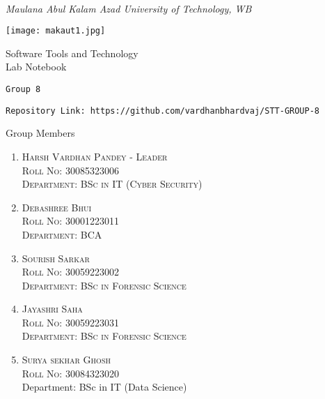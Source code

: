 \documentclass[a4paper,12pt]{article}
\begin{document}
\begin{titlepage}
    \centering
    \vspace*{0 cm}
    \Large\\
    \textit{Maulana Abul Kalam Azad University of Technology, WB}
    \vspace{0.5cm}
    
    \texttt{[image: makaut1.jpg]} %
    \vspace{0.5cm}
    
    \LARGE
    \textit{}{{Software Tools and Technology\\
        Lab Notebook }}
    \vspace{0.5cm}
    
    \large
    \texttt{Group 8}
    \vspace{1 cm}
    
    \texttt{Repository Link: https://github.com/vardhanbhardvaj/STT-GROUP-8}
    \vspace{1cm}
    
    \textit{}{Group Members}
    \vspace{0.5cm}

    \normalsize
    \begin{enumerate}
        \item \textsc{Harsh Vardhan Pandey - Leader}\\ 
              \textsc{Roll No: 30085323006}\\   
              \textsc{Department: BSc in IT (Cyber Security)}
        \item \textsc{Debashree Bhui}\\
              \textsc{Roll No: 30001223011}\\
              \textsc{Department: BCA}
        \item \textsc{Sourish Sarkar}\\
              \textsc{Roll No: 30059223002}\\
              \textsc{Department: BSc in Forensic Science}
        \item \textsc{Jayashri Saha}\\
              \textsc{Roll No: 30059223031}\\
              \textsc{Department: BSc in Forensic Science}
        \item \textsc{Surya sekhar Ghosh}\\
              \textsc{Roll No: 30084323020}\\
              \textsc{}{Department: BSc in IT (Data Science)}
    \end{enumerate}
    \vspace{0.8 cm}

    \end{titlepage}
    \newpage
\end{document}
